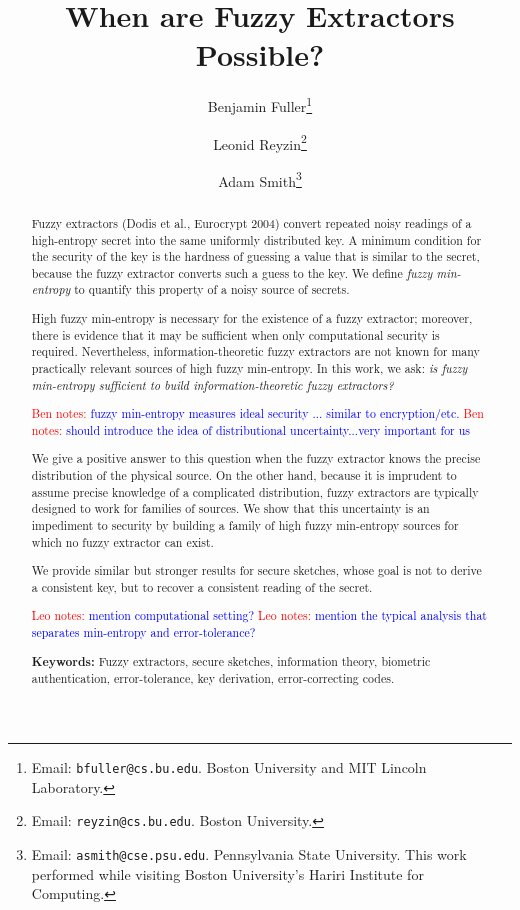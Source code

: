 \documentclass[11pt]{article}
\title{When are Fuzzy Extractors Possible?}
\author{
Benjamin Fuller\footnote{Email: {\tt bfuller@cs.bu.edu}.  Boston
  University and MIT Lincoln Laboratory.}  \and Leonid
Reyzin\footnote{Email: {\tt reyzin@cs.bu.edu}.  Boston University.}
\and Adam Smith\footnote{Email: {\tt asmith@cse.psu.edu}.
  Pennsylvania State University. This work performed while visiting Boston
  University's Hariri Institute for Computing.}}
\newcommand{\authnote}[2]{{\textcolor{red}{\textsf{#1 notes: }\textcolor{blue}{ #2}}\marginpar{\textcolor{red}{\textbf{!!!!!}}}}}
\newcommand{\authnote}[2]{}
\newcommand{\bnote}[1]{{\authnote{Ben}{#1}}}
\newcommand{\lnote}[1]{{\authnote{Leo}{#1}}}
\begin{document}
\maketitle

\begin{abstract}
Fuzzy extractors (Dodis et al., Eurocrypt 2004) convert repeated noisy readings of a high-entropy secret into the same uniformly distributed key. A minimum condition for the security of the key is the hardness of guessing a value that is similar to the secret, because the fuzzy extractor converts such a guess to the key.
We define \emph{fuzzy min-entropy} to quantify this property of a noisy source of secrets.

High fuzzy min-entropy is necessary for the existence of a fuzzy extractor; moreover, there is evidence that it may be sufficient when only computational security is required. Nevertheless, information-theoretic fuzzy extractors are not known for many practically relevant sources of high fuzzy min-entropy. In this work, we ask: \emph{is fuzzy min-entropy sufficient to build information-theoretic fuzzy extractors?} 

\bnote{fuzzy min-entropy measures ideal security ... similar to encryption/etc.}
\bnote{should introduce the idea of distributional uncertainty...very important for us}

We give a positive answer to this question when the fuzzy extractor knows the precise distribution of the physical source.  On the other hand, because it is imprudent to assume precise knowledge of a complicated distribution,  fuzzy extractors are typically designed to work for families of sources. We show that this uncertainty is an impediment to security by building a family of high fuzzy min-entropy sources for which no fuzzy extractor can exist.

We provide similar but stronger results for secure sketches, whose goal is not to derive a consistent key, but to recover a consistent reading of the secret.

\lnote{mention computational setting?}
\lnote{mention the typical analysis that separates min-entropy and error-tolerance?}

\medskip
\textbf{Keywords:} Fuzzy extractors, secure sketches, information theory, biometric authentication, error-tolerance, key derivation, error-correcting codes.
\end{abstract}
\end{document}
